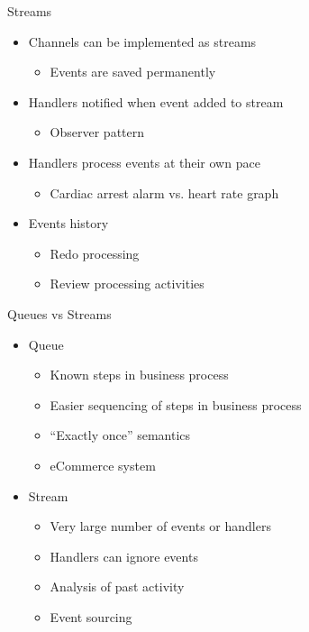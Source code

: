 \documentclass{slide}
\begin{document}
\begin{frame}{Streams}
    \vspace{1mm}
    {\LARGE
    \begin{itemize}
        \item Channels can be implemented as streams
        \begin{itemize}
            \Large\item Events are saved permanently
	\end{itemize}
        \vspace{3mm}
        \item Handlers notified when event added to stream
        \begin{itemize}
            \Large\item Observer pattern
	\end{itemize}
        \vspace{3mm}
        \item Handlers process events at their own pace
        \begin{itemize}
            \Large\item Cardiac arrest alarm vs. heart rate graph
	\end{itemize}
        \vspace{3mm}
        \item Events history
        \begin{itemize}
            \Large\item Redo processing
            \Large\item Review processing activities
	\end{itemize}
    \end{itemize}
    }
\end{frame}

\begin{frame}{Queues vs Streams}
    \vspace{1mm}
    {\LARGE
    \begin{itemize}
        \item Queue
        \begin{itemize}
            \Large\item Known steps in business process
            \Large\item Easier sequencing of steps in business process
            \Large\item ``Exactly once'' semantics
            \Large\item eCommerce system
	\end{itemize}
        \vspace{3mm}
        \item Stream
        \begin{itemize}
            \Large\item Very large number of events or handlers
            \Large\item Handlers can ignore events
            \Large\item Analysis of past activity
            \Large\item Event sourcing
	\end{itemize}
    \end{itemize}
    }
\end{frame}
\end{document}
